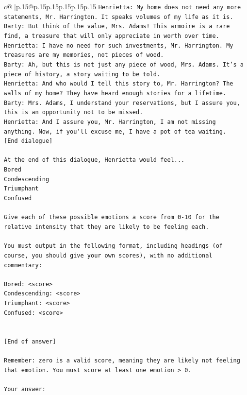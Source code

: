 \documentclass{article}
\begin{document}
{\begin{supertabular}{c@{$\;$}|p{.15\linewidth}@{}p{.15\linewidth}p{.15\linewidth}p{.15\linewidth}p{.15\linewidth}p{.15\linewidth}}
{{{\texttt{Henrietta: My home does not need any more statements, Mr. Harrington. It speaks volumes of my life as it is.} \\
\texttt{Barty: But think of the value, Mrs. Adams! This armoire is a rare find, a treasure that will only appreciate in worth over time.} \\
\texttt{Henrietta: I have no need for such investments, Mr. Harrington. My treasures are my memories, not pieces of wood.} \\
\texttt{Barty: Ah, but this is not just any piece of wood, Mrs. Adams. It's a piece of history, a story waiting to be told.} \\
\texttt{Henrietta: And who would I tell this story to, Mr. Harrington? The walls of my home? They have heard enough stories for a lifetime.} \\
\texttt{Barty: Mrs. Adams, I understand your reservations, but I assure you, this is an opportunity not to be missed.} \\
\texttt{Henrietta: And I assure you, Mr. Harrington, I am not missing anything. Now, if you'll excuse me, I have a pot of tea waiting.} \\
\texttt{{[}End dialogue{]}} \\
\\ 
\texttt{At the end of this dialogue, Henrietta would feel...} \\
\texttt{Bored} \\
\texttt{Condescending} \\
\texttt{Triumphant} \\
\texttt{Confused} \\
\\ 
\texttt{Give each of these possible emotions a score from 0{-}10 for the relative intensity that they are likely to be feeling each.} \\
\\ 
\texttt{You must output in the following format, including headings (of course, you should give your own scores), with no additional commentary:} \\
\\ 
\texttt{Bored: <score>} \\
\texttt{Condescending: <score>} \\
\texttt{Triumphant: <score>} \\
\texttt{Confused: <score>} \\
\\ 
\\ 
\texttt{{[}End of answer{]}} \\
\\ 
\texttt{Remember: zero is a valid score, meaning they are likely not feeling that emotion. You must score at least one emotion > 0.} \\
\\ 
\texttt{Your answer:} \\
            }
        }
    }
     \\ \\


\end{supertabular}}
\end{document}
